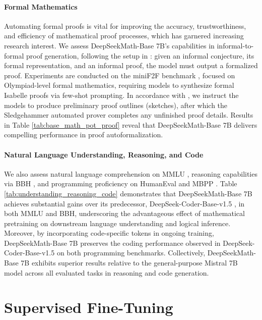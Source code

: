 \begin{itemize}[topsep=0pt]
\paragraph{Formal Mathematics}

Automating formal proofs is vital for improving the accuracy, trustworthiness, and efficiency of mathematical proof processes, which has garnered increasing research interest. We assess DeepSeekMath-Base 7B’s capabilities in informal-to-formal proof generation, following the setup in \citep{dsp_proof}: given an informal conjecture, its formal representation, and an informal proof, the model must output a formalized proof. Experiments are conducted on the miniF2F benchmark \citep{minif2f}, focused on Olympiad-level formal mathematics, requiring models to synthesize formal Isabelle proofs via few-shot prompting. In accordance with \cite{dsp_proof}, we instruct the models to produce preliminary proof outlines (sketches), after which the Sledgehammer automated prover \citep{sledgehammer} completes any unfinished proof details. Results in Table \ref{tab:base_math_pot_proof} reveal that DeepSeekMath-Base 7B delivers compelling performance in proof autoformalization.

\paragraph{Natural Language Understanding, Reasoning, and Code}

We also assess natural language comprehension on MMLU \citep{mmlu}, reasoning capabilities via BBH \citep{bbh}, and programming proficiency on HumanEval \citep{codex} and MBPP \citep{mbpp}. Table \ref{tab:understanding_reasoning_code} demonstrates that DeepSeekMath-Base 7B achieves substantial gains over its predecessor, DeepSeek-Coder-Base-v1.5 \citep{deepseek-coder}, in both MMLU and BBH, underscoring the advantageous effect of mathematical pretraining on downstream language understanding and logical inference. Moreover, by incorporating code-specific tokens in ongoing training, DeepSeekMath-Base 7B preserves the coding performance observed in DeepSeek-Coder-Base-v1.5 on both programming benchmarks. Collectively, DeepSeekMath-Base 7B exhibits superior results relative to the general-purpose Mistral 7B model \citep{mistral} across all evaluated tasks in reasoning and code generation.

\section{Supervised Fine-Tuning}


\end{itemize}

